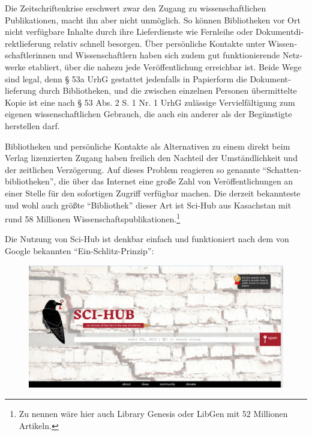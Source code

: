 \documentclass[a4paper,
fontsize=11pt,
oneside,
numbers=noperiodatend,
parskip=half-,
bibliography=totoc,
final
]{scrartcl}
\begin{document}
Die Zeitschriftenkrise erschwert zwar den Zugang zu wissenschaftlichen
Publikationen, macht ihn aber nicht unmöglich. So können Bibliotheken
vor Ort nicht verfügbare Inhalte durch ihre Lieferdienste wie Fernleihe
oder Dokumentdi­rektlieferung relativ schnell besorgen. Über persönliche
Kontakte unter Wissen­schaftlerinnen und Wissenschaftlern haben sich
zudem gut funktionierende Netz­werke etabliert, über die nahezu jede
Veröffentlichung erreichbar ist. Beide Wege sind legal, denn § 53a UrhG
gestattet jedenfalls in Papierform die Dokument­lieferung durch
Bibliotheken, und die zwischen einzelnen Personen übermittelte Kopie ist
eine nach § 53 Abs. 2 S. 1 Nr. 1 UrhG zulässige Verviel­fältigung zum
eigenen wissenschaftlichen Gebrauch, die auch ein anderer als der
Begünstigte herstellen darf.

Bibliotheken und persönliche Kontakte als Alternativen zu einem direkt
beim Verlag lizenzierten Zugang haben freilich den Nachteil der
Umständlichkeit und der zeitlichen Verzögerung. Auf dieses Problem
reagieren so genannte \enquote{Schatten­bibliotheken}, die über das
Internet eine große Zahl von Veröffentlichungen an einer Stelle für den
sofortigen Zugriff verfügbar machen. Die derzeit bekannteste und wohl
auch größte \enquote{Bibliothek} dieser Art ist Sci-Hub aus Kasachstan
mit rund 58 Millionen Wissenschaftspublikationen.\footnote{Zu nennen
  wäre hier auch Library Genesis oder LibGen mit 52 Millionen Artikeln.}

Die Nutzung von Sci-Hub ist denkbar einfach und funktioniert nach dem
von Google bekannten \enquote{Ein-Schlitz-Prinzip}:

\begin{figure}[H]
\centering
\includegraphics{img/abbildung.png}
\end{figure}
\end{document}
